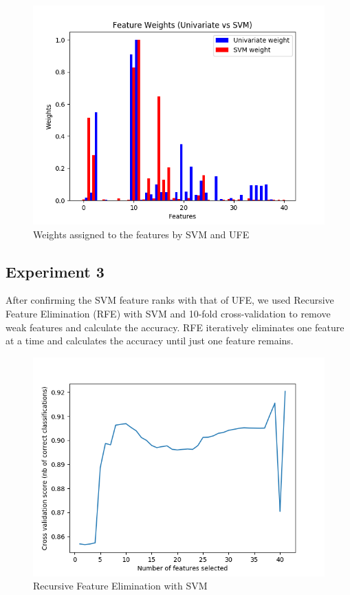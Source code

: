 \begin{figure}[htb]
	\centering
	\includegraphics[width=1\textwidth]{images/ufe_svm.png}
	\caption{Weights assigned to the features by SVM and UFE} 
	\label{fig:result_ufe_svm}
\end{figure}

\subsection{Experiment 3}

After confirming the SVM feature ranks with that of UFE, we used Recursive Feature Elimination (RFE) with SVM and 10-fold cross-validation to remove weak features and calculate the accuracy. RFE iteratively eliminates one feature at a time and calculates the accuracy until just one feature remains.

\begin{figure}[htb]
	\centering
	\includegraphics[width=1\textwidth]{images/rfe_svm.png}
	\caption{Recursive Feature Elimination with SVM} 
	\label{fig:result_rfe}
\end{figure}

